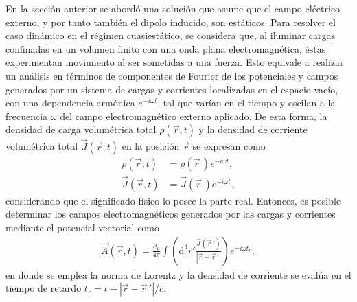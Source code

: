 En la sección anterior se abordó una solución que asume que el campo eléctrico externo, y por tanto también el dipolo inducido, son estáticos. Para resolver el caso dinámico en el régimen cuasiestático, se considera que, al iluminar cargas confinadas en un volumen finito con una onda plana electromagnética, éstas experimentan movimiento al ser sometidas a una fuerza. Esto equivale a realizar un análisis en términos de componentes de Fourier de los potenciales y campos generados por un sistema de cargas y corrientes localizadas en el espacio vacío, con una dependencia armónica $e^{-i\omega t}$, tal que varían en el tiempo y oscilan a la frecuencia $\omega$ del campo electromagnético externo aplicado. De esta forma, la densidad de carga volumétrica total $\rho(\Vec{r},t)$ y la densidad de corriente volumétrica total $\Vec{J}(\Vec{r},t)$  en la posición $\Vec{r}$ se expresan como \cite{Jackson}
\begin{align}
    \rho(\Vec{r},t)&=\rho(\Vec{r}\,)e^{-i\omega t},\nonumber\\
    \Vec{J}(\Vec{r},t)&=\Vec{J}(\Vec{r}\,)e^{-i\omega t},
    \label{armonicf}
\end{align}
considerando que el significado físico lo posee la parte real. Entonces, es posible determinar los campos electromagnéticos generados por las cargas y corrientes mediante el potencial vectorial como \cite{Jackson}
\begin{align}
  \Vec{A}(\Vec{r},t)=\frac{\mu_0}{4\pi}\int \left( \text{d}^3r'\frac{\Vec{J}(\Vec{r}\,')}{|\Vec{r}-\Vec{r}\,'|}\right)e^{-i\omega t_r},
  \label{Achafa}
\end{align}
en donde se emplea la norma de Lorentz \cite{Griffiths} y la densidad de corriente se evalúa en el tiempo de retardo $t_r=t-|\Vec{r}-\Vec{r}\,'|/c$. \\


